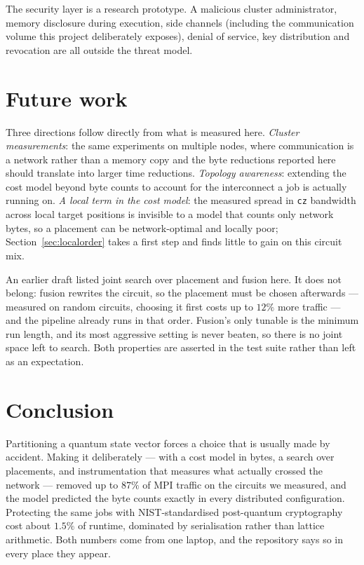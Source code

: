 \documentclass[11pt]{article}
\begin{document}
The security layer is a research prototype. A malicious cluster administrator,
memory disclosure during execution, side channels (including the communication
volume this project deliberately exposes), denial of service, key distribution
and revocation are all outside the threat model.

\section{Future work}

Three directions follow directly from what is measured here. \emph{Cluster
measurements}: the same experiments on
multiple nodes, where communication is a network rather than a memory copy and
the byte reductions reported here should translate into larger time reductions.
\emph{Topology awareness}: extending the cost model beyond byte counts to
account for the interconnect a job is actually running on. \emph{A local term
in the cost model}: the measured spread in \texttt{cz} bandwidth across local
target positions is invisible to a model that counts only network bytes, so a
placement can be network-optimal and locally poor;
Section~\ref{sec:localorder} takes a first step and finds little to gain on
this circuit mix.

An earlier draft listed joint search over placement and fusion here. It does
not belong: fusion rewrites the circuit, so the placement must be chosen
afterwards --- measured on random circuits, choosing it first costs up to
$12\%$ more traffic --- and the pipeline already runs in that order. Fusion's
only tunable is the minimum run length, and its most aggressive setting is
never beaten, so there is no joint space left to search. Both properties are
asserted in the test suite rather than left as an expectation.

\section{Conclusion}

Partitioning a quantum state vector forces a choice that is usually made by
accident. Making it deliberately --- with a cost model in bytes, a search over
placements, and instrumentation that measures what actually crossed the network
--- removed up to $87\%$ of MPI traffic on the circuits we measured, and the
model predicted the byte counts exactly in every distributed configuration.
Protecting the same jobs with NIST-standardised post-quantum cryptography cost
about $1.5\%$ of runtime, dominated by serialisation rather than lattice
arithmetic. Both numbers come from one laptop, and the repository says so in
every place they appear.



\end{document}
